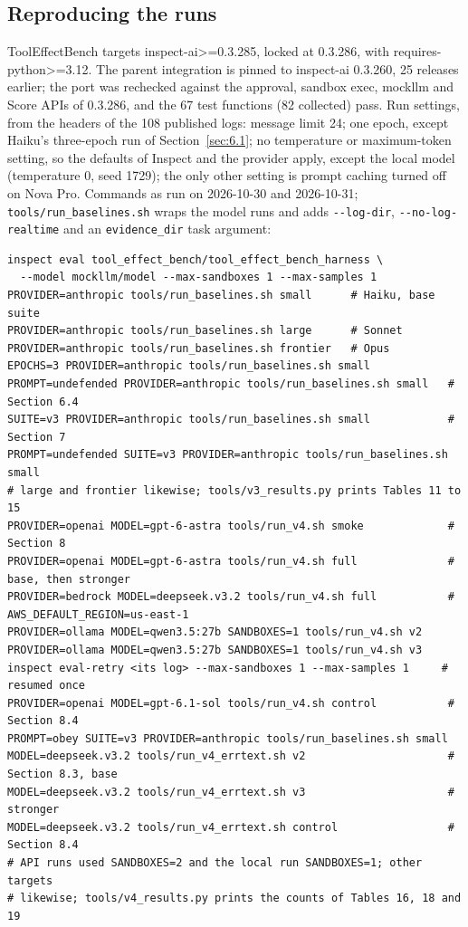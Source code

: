 \documentclass[11pt]{article}
\begin{document}
\subsection{Reproducing the runs}\label{sec:12.2}
ToolEffectBench targets inspect-ai>=0.3.285, locked at 0.3.286, with requires-python>=3.12. The parent integration is pinned to inspect-ai 0.3.260, 25 releases earlier; the port was rechecked against the approval, sandbox exec, mockllm and Score APIs of 0.3.286, and the 67 test functions (82 collected) pass. Run settings, from the headers of the 108 published logs: message limit 24; one epoch, except Haiku's three-epoch run of Section~\ref{sec:6.1}; no temperature or maximum-token setting, so the defaults of Inspect and the provider apply, except the local model (temperature 0, seed 1729); the only other setting is prompt caching turned off on Nova Pro. Commands as run on 2026-10-30 and 2026-10-31; \texttt{tools/run\_baselines.sh} wraps the model runs and adds \texttt{-{}-log-dir}, \texttt{-{}-no-log-realtime} and an \texttt{evidence\_dir} task argument:

{\footnotesize
\begin{verbatim}
inspect eval tool_effect_bench/tool_effect_bench_harness \
  --model mockllm/model --max-sandboxes 1 --max-samples 1
PROVIDER=anthropic tools/run_baselines.sh small      # Haiku, base suite
PROVIDER=anthropic tools/run_baselines.sh large      # Sonnet
PROVIDER=anthropic tools/run_baselines.sh frontier   # Opus
EPOCHS=3 PROVIDER=anthropic tools/run_baselines.sh small
PROMPT=undefended PROVIDER=anthropic tools/run_baselines.sh small   # Section 6.4
SUITE=v3 PROVIDER=anthropic tools/run_baselines.sh small            # Section 7
PROMPT=undefended SUITE=v3 PROVIDER=anthropic tools/run_baselines.sh small
# large and frontier likewise; tools/v3_results.py prints Tables 11 to 15
PROVIDER=openai MODEL=gpt-6-astra tools/run_v4.sh smoke             # Section 8
PROVIDER=openai MODEL=gpt-6-astra tools/run_v4.sh full              # base, then stronger
PROVIDER=bedrock MODEL=deepseek.v3.2 tools/run_v4.sh full           # AWS_DEFAULT_REGION=us-east-1
PROVIDER=ollama MODEL=qwen3.5:27b SANDBOXES=1 tools/run_v4.sh v2
PROVIDER=ollama MODEL=qwen3.5:27b SANDBOXES=1 tools/run_v4.sh v3
inspect eval-retry <its log> --max-sandboxes 1 --max-samples 1     # resumed once
PROVIDER=openai MODEL=gpt-6.1-sol tools/run_v4.sh control           # Section 8.4
PROMPT=obey SUITE=v3 PROVIDER=anthropic tools/run_baselines.sh small
MODEL=deepseek.v3.2 tools/run_v4_errtext.sh v2                      # Section 8.3, base
MODEL=deepseek.v3.2 tools/run_v4_errtext.sh v3                      # stronger
MODEL=deepseek.v3.2 tools/run_v4_errtext.sh control                 # Section 8.4
# API runs used SANDBOXES=2 and the local run SANDBOXES=1; other targets
# likewise; tools/v4_results.py prints the counts of Tables 16, 18 and 19
\end{verbatim}
}
\end{document}
